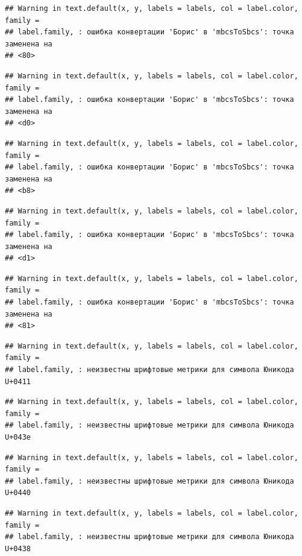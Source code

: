 \documentclass[]{book}
\begin{document}
\begin{verbatim}
## Warning in text.default(x, y, labels = labels, col = label.color, family =
## label.family, : ошибка конвертации 'Борис' в 'mbcsToSbcs': точка заменена на
## <80>
\end{verbatim}

\begin{verbatim}
## Warning in text.default(x, y, labels = labels, col = label.color, family =
## label.family, : ошибка конвертации 'Борис' в 'mbcsToSbcs': точка заменена на
## <d0>
\end{verbatim}

\begin{verbatim}
## Warning in text.default(x, y, labels = labels, col = label.color, family =
## label.family, : ошибка конвертации 'Борис' в 'mbcsToSbcs': точка заменена на
## <b8>
\end{verbatim}

\begin{verbatim}
## Warning in text.default(x, y, labels = labels, col = label.color, family =
## label.family, : ошибка конвертации 'Борис' в 'mbcsToSbcs': точка заменена на
## <d1>
\end{verbatim}

\begin{verbatim}
## Warning in text.default(x, y, labels = labels, col = label.color, family =
## label.family, : ошибка конвертации 'Борис' в 'mbcsToSbcs': точка заменена на
## <81>
\end{verbatim}

\begin{verbatim}
## Warning in text.default(x, y, labels = labels, col = label.color, family =
## label.family, : неизвестны шрифтовые метрики для символа Юникода U+0411
\end{verbatim}

\begin{verbatim}
## Warning in text.default(x, y, labels = labels, col = label.color, family =
## label.family, : неизвестны шрифтовые метрики для символа Юникода U+043e
\end{verbatim}

\begin{verbatim}
## Warning in text.default(x, y, labels = labels, col = label.color, family =
## label.family, : неизвестны шрифтовые метрики для символа Юникода U+0440
\end{verbatim}

\begin{verbatim}
## Warning in text.default(x, y, labels = labels, col = label.color, family =
## label.family, : неизвестны шрифтовые метрики для символа Юникода U+0438
\end{verbatim}
\end{document}
